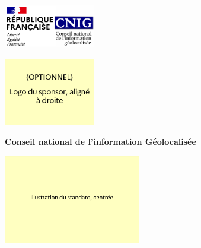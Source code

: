 \begin{titlepage}
    \centering

    \begin{minipage}{0.45\textwidth}
        \raggedright
        \includegraphics[width=4cm]{./ressources/logo_cnig.png}
    \end{minipage}
    \hfill
    \begin{minipage}{0.45\textwidth}
        \raggedleft
        \includegraphics[width=4cm]{./ressources/logo_sponsor.PNG} %
    \end{minipage}

    \vspace{1cm} 

    {\Huge\bfseries Conseil national de l'information Géolocalisée\par}

    \vspace{1cm} 

    \includegraphics[width=6cm]{./ressources/illustration_standard.PNG} %

    \vspace{1cm} 


\end{titlepage}

